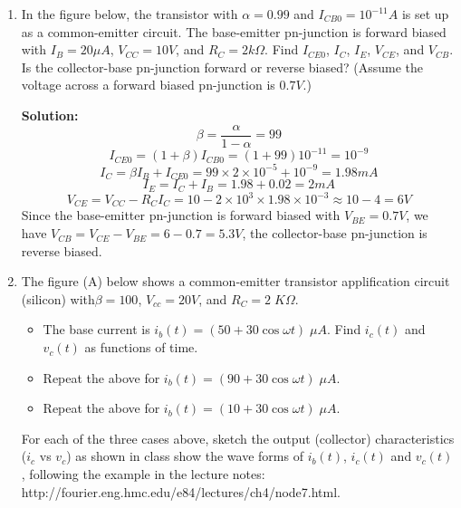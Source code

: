 \begin{enumerate}
\begin{itemize}
  Note: in the figure above, as the assumed polarities of both $I_E$ and 
  $V_{EB}$ are the opposite to those assumed in plot (b) below, the negative
  signs for both $I_E$ and $V_{EB}$ in the plot should be dropped.

\end{itemize}


{\bf Solution:} $\alpha=\beta/(1+\beta)=24/25=0.96$, 
$I_C=I_E \alpha + I_{CB0}=2 mA \times 1.92+0.01=1.921 mA$,
$I_B=I_C/\beta=1.92/24=0.08$, or $I_B=I_E-I_C=2-1.96=0.08 mA$.

If $V_{EB}=0.7 V$ and $V_{CB}=15V$, $I_E=5 mA$ can be estimated from 
figure (b), and correspondingly, $I_C=4.8 mA$ and $I_B=0.2 mA$. When 
$V_{EB}=0.8 V$, $I_E=20 mA$, $I_C=19.2 mA$, and $I_B=0.8 mA$.

\item In the figure below, the transistor with $\alpha=0.99$ and
  $I_{CB0}=10^{-11} A$ is set up as a common-emitter circuit. The
  base-emitter pn-junction is forward biased with $I_B=20 \mu A$, 
  $V_{CC}=10V$, and $R_C=2k\Omega$. Find $I_{CE0}$, $I_C$, $I_E$, 
  $V_{CE}$, and $V_{CB}$. Is the collector-base pn-junction forward
  or reverse biased? (Assume the voltage across a forward biased 
  pn-junction is $0.7 V$.)
  

{\bf Solution:} 
\[ \beta=\frac{\alpha}{1-\alpha}=99 \]
\[ I_{CE0}=(1+\beta) I_{CB0}=(1+99) 10^{-11}=10^{-9} \]
\[ I_C=\beta I_B+I_{CE0}=99 \times 2 \times 10^{-5} + 10^{-9}=1.98 mA \]
\[ I_E=I_C+I_B=1.98+0.02=2 mA \]
\[ V_{CE}=V_{CC}-R_C I_C=10-2 \times 10^3 \times 1.98 \times 10^{-3}
   \approx 10-4=6 V \]
Since the base-emitter pn-junction is forward biased with $V_{BE}=0.7V$,
we have $V_{CB}=V_{CE}-V_{BE}=6-0.7=5.3 V$, the collector-base pn-junction
is reverse biased.

\item The figure (A) below shows a common-emitter transistor 
applification circuit (silicon) with$\beta=100$, $V_{cc}=20V$, 
and $R_C=2\;K\Omega$. 
\begin{itemize}
\item The base current is $i_b(t)=(50+30 \cos \omega t)\;\mu A$.
Find $i_c(t)$ and $v_c(t)$ as functions of time.
\item Repeat the above for $i_b(t)=(90+30 \cos \omega t)\;\mu A$.
\item Repeat the above for $i_b(t)=(10+30 \cos \omega t)\;\mu A$.
\end{itemize}
For each of the three cases above, sketch the output (collector) 
characteristics ($i_c$ vs $v_c$) as shown in class show the wave
forms of $i_b(t)$, $i_c(t)$ and $v_c(t)$, following the example
in the lecture notes:
http://fourier.eng.hmc.edu/e84/lectures/ch4/node7.html.


\end{enumerate}
